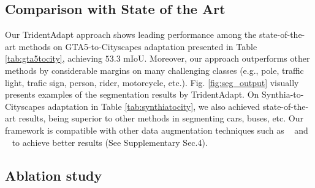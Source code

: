\documentclass{bmvc2k}
\newcommand{\Fig}[1]{Fig. \ref{fig:#1}}
\newcommand{\Tab}[1]{Table \ref{tab:#1}}
\begin{document}
\subsection{Comparison with State of the Art}

Our TridentAdapt approach shows leading performance among the state-of-the-art methods on GTA5-to-Cityscapes adaptation presented in \Tab{gta5tocity}, achieving $53.3$ mIoU. Moreover, our approach outperforms other methods by considerable margins on many challenging classes (e.g., pole, traffic light, trafic sign, person, rider, motorcycle, etc.). \Fig{seg_output} visually presents examples of the segmentation results by  TridentAdapt. On Synthia-to-Cityscapes adaptation in \Tab{synthiatocity}, we also achieved state-of-the-art results, being superior to other methods in segmenting cars, buses, etc. Our framework is compatible with other data augmentation techniques such as ~\cite{yun2019cutmix} and ~\cite{olsson2021classmix} to achieve better results (See Supplementary Sec.4).




\subsection{Ablation study}
\end{document}

